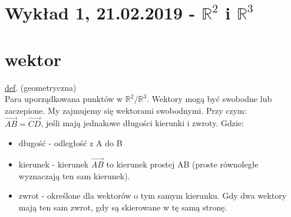 \documentclass[12pt]{article}
\begin{document}
\section*{Wykład 1, 21.02.2019 - $\mathbb{R}^2$ i $\mathbb{R}^3$}

\section{wektor}
\begin{minipage}[t]{0.48\textwidth}
    \underline{def}. (geometryczna) \\
        Para uporządkowana punktów w $\mathbb{R}^2 / \mathbb{R}^3 $. 
        Wektory mogą być swobodne lub zaczepione. My zajmujemy się wektorami swobodnymi. Przy czym:\\
        $ \overrightarrow{AB} = \overrightarrow{CD}$, jeśli mają jednakowe długości kierunki i zwroty. Gdzie:
        \begin{itemize} 
            \item długość - odległość z A do B
            \item kierunek - kierunek $ \overrightarrow{AB} $ to kierunek prostej AB (proste równoległe wyznaczają ten sam kierunek).
            \item zwrot - określone dla wektorów o tym samym kierunku. Gdy dwa wektory mają ten sam zwrot, gdy są skierowane w tę samą stronę.
        \end{itemize}
\end{minipage}
\hfill\vline\hfill
\end{document}
